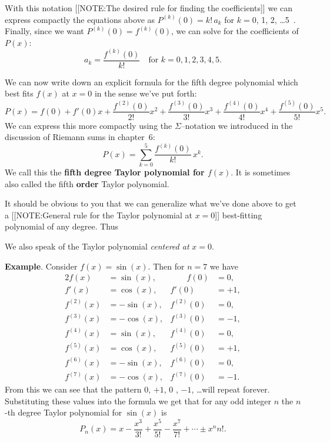 With this notation 
[[NOTE:The desired rule for finding the coefficients]]
we can express compactly the equations above as $P^{(k)}(0)=k!\,a_k$
for $k=0$, 1, 2, \ldots 5 \,.  Finally, since we want
$P^{(k)}(0)=f^{(k)}(0)$, we can solve for the coefficients of $P(x)$:
\[
a_k = \frac{f^{(k)}(0)}{k!} \quad \text{for $k=0,1,2,3,4,5$}.
\]

We can now write down an explicit formula for the fifth degree
polynomial which best fits $f(x)$ at $x=0$ in the sense we've put
forth:
\[
P(x) = f(0) + f'(0)x + \frac{f^{(2)}(0)}{2!}x^2 
   + \frac{f^{(3)}(0)}{3!}x^3 + \frac{f^{(4)}(0)}{4!}x^4 
   + \frac{f^{(5)}(0)}{5!}x^5.
\]
We can express this more compactly using the $\Sigma$--notation we
introduced in the discussion of Riemann sums in chapter~6:
\[
P(x)=\sum_{k=0}^{5} \frac{f^{(k)}(0)}{k!}\,x^k.
\]
We call this the {\bf fifth degree Taylor polynomial for $f(x)$}.  It
is sometimes also called the fifth {\bf order} Taylor polynomial.

It should be obvious to you that we can generalize what we've done
above to get a
[[NOTE:General rule for  the Taylor polynomial  at $x=0$]]
best-fitting polynomial of any degree.
Thus
\begin{center}
\end{center}
We also speak of the Taylor polynomial {\em centered at} $x=0$.






{\bf Example}.  \quad Consider $f(x) = \sin(x)$. Then for $n=7$ we have 
\begin{alignat*}{2}
f(x)       &= \sin(x),  &\qquad f(0)       &= 0,   \\
f'(x)      &= \cos(x),  &       f'(0)      &= +1,  \\
f^{(2)}(x) &= -\sin(x), &       f^{(2)}(0) &= 0,   \\
f^{(3)}(x) &= -\cos(x), &       f^{(3)}(0) &= -1,  \\
f^{(4)}(x) &= \sin(x),  &       f^{(4)}(0) &= 0,   \\
f^{(5)}(x) &= \cos(x),  &       f^{(5)}(0) &= +1,  \\
f^{(6)}(x) &= -\sin(x), &       f^{(6)}(0) &= 0,   \\
f^{(7)}(x) &= -\cos(x), &       f^{(7)}(0) &= -1. 
\end{alignat*}
From this we can see that the pattern 0, $+1$, 0 , $-1$, \ldots will
repeat forever.  Substituting these values into the formula we get
that for any odd integer $n$ the $n$-th degree Taylor polynomial for
$\sin(x)$ is
\[
        P_n(x) =  x - \dfrac{x^3}{3!} + \dfrac{x^5}{5!} 
                - \dfrac{x^7}{7!} + \cdots \pm {x^n}{n!}.
\]

